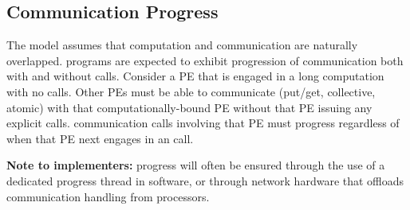 \subsection{Communication Progress}

The \openshmem model assumes that computation and communication are
naturally overlapped.  \openshmem programs are expected to exhibit
progression of communication both with and without \openshmem calls.
Consider a \ac{PE} that is engaged in a long computation with no \openshmem calls.
Other \ac{PE}s must be able to communicate (put/get,
collective, atomic) with that computationally-bound \ac{PE} without that \ac{PE}
issuing any explicit \openshmem calls. \openshmem communication calls involving that \ac{PE} must progress
regardless of when that \ac{PE} next engages in an \openshmem call.

\textbf{Note to implementers:} progress will often be ensured through
the use of a dedicated progress thread in software, or through
network hardware that offloads communication handling from processors.



